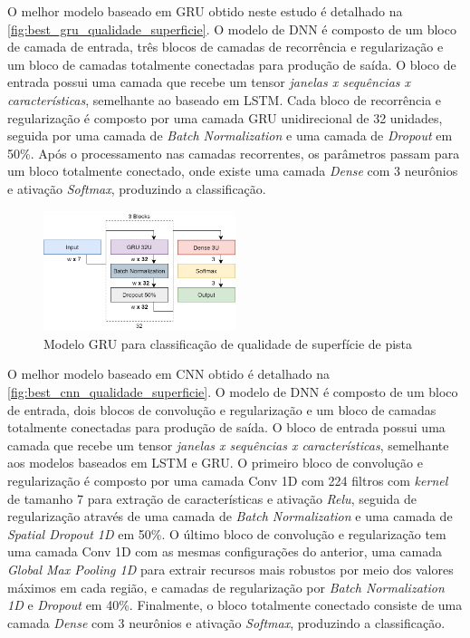 O melhor modelo baseado em GRU obtido neste estudo é detalhado na \autoref{fig:best_gru_qualidade_superficie}. O modelo de DNN é composto de um bloco de camada de entrada, três blocos de camadas de recorrência e regularização e um bloco de camadas totalmente conectadas para produção de saída. O bloco de entrada possui uma camada que recebe um tensor \emph{janelas x sequências x características}, semelhante ao baseado em LSTM. Cada bloco de recorrência e regularização é composto por uma camada GRU unidirecional de 32 unidades, seguida por uma camada de \textit{Batch Normalization} e uma camada de \textit{Dropout} em 50\%. Após o processamento nas camadas recorrentes, os parâmetros passam para um bloco totalmente conectado, onde existe uma camada \textit{Dense} com 3 neurônios e ativação \textit{Softmax}, produzindo a classificação.

\begin{figure}[h!]
  \centering
  \caption{Modelo GRU para classificação de qualidade de superfície de pista}
  \label{fig:best_gru_qualidade_superficie}
  \includegraphics[width=0.5\textwidth]{figuras/fig_47.png}
\end{figure}

O melhor modelo baseado em CNN obtido é detalhado na \autoref{fig:best_cnn_qualidade_superficie}. O modelo de DNN é composto de um bloco de entrada, dois blocos de convolução e regularização e um bloco de camadas totalmente conectadas para produção de saída. O bloco de entrada possui uma camada que recebe um tensor \emph{janelas x sequências x características}, semelhante aos modelos baseados em LSTM e GRU. O primeiro bloco de convolução e regularização é composto por uma camada Conv 1D com 224 filtros com \textit{kernel} de tamanho 7 para extração de características e ativação \textit{Relu}, seguida de regularização através de uma camada de \textit{Batch Normalization} e uma camada de \textit{Spatial Dropout 1D} em 50\%. O último bloco de convolução e regularização tem uma camada Conv 1D com as mesmas configurações do anterior, uma camada \textit{Global Max Pooling 1D} para extrair recursos mais robustos por meio dos valores máximos em cada região, e camadas de regularização por \textit{Batch Normalization 1D} e \textit{Dropout} em 40\%. Finalmente, o bloco totalmente conectado consiste de uma camada \textit{Dense} com 3 neurônios e ativação \textit{Softmax}, produzindo a classificação.

